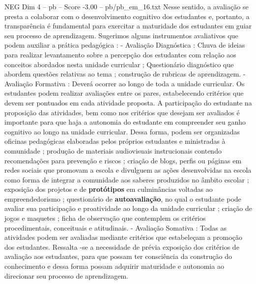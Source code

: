 \begin{textsample}{NEG Dim 4 – pb – Score -3.00 – pb/pb\_em\_16.txt}
Nesse sentido, a avaliação se presta a colaborar com o desenvolvimento cognitivo dos estudantes e, portanto, a transparência é fundamental para exercitar a maturidade dos estudantes em guiar seu processo de aprendizagem.
Sugerimos alguns instrumentos avaliativos que podem auxiliar a prática pedagógica : - Avaliação Diagnóstica : Chuva de ideias para realizar levantamento sobre a percepção dos estudantes com relação aos conceitos abordados nesta unidade curricular ; Questionário diagnóstico que abordem questões relativas ao tema ; construção de rubricas de aprendizagem. - Avaliação Formativa : Deverá ocorrer ao longo de toda a unidade curricular.
Os estudantes podem realizar avaliações entre os pares, estabelecendo critérios que devem ser pontuados em cada atividade proposta.
A participação do estudante na proposição das atividades, bem como nos critérios que desejam ser avaliados é importante para que haja a autonomia do estudante em compreender seu ganho cognitivo ao longo na unidade curricular.
Dessa forma, podem ser organizadas oficinas pedagógicas elaboradas pelos próprios estudantes e ministradas à comunidade ; produção de materiais audiovisuais instrucionais contendo recomendações para prevenção e riscos ; criação de blogs, perfis ou páginas em redes sociais que promovam a escola e divulguem as ações desenvolvidas na escola como forma de integrar a comunidade aos saberes produzidos no âmbito escolar ; exposição dos projetos e de \textbf{protótipos} em culminâncias voltadas ao empreendedorismo ; questionário de \textbf{autoavaliação}, no qual o estudante pode avaliar sua participação e proatividade ao longo da unidade curricular ; criação de jogos e maquetes ; ficha de observação que contemplem os critérios procedimentais, conceituais e atitudinais. - Avaliação Somativa : Todas as atividades podem ser avaliadas mediante critérios que estabeleçam a promoção dos estudantes.
Ressalta -se a necessidade de prévia exposição dos critérios de avaliação aos estudantes, para que possam ter consciência da construção do conhecimento e dessa forma possam adquirir maturidade e autonomia ao direcionar seu processo de aprendizagem.

\end{textsample}
